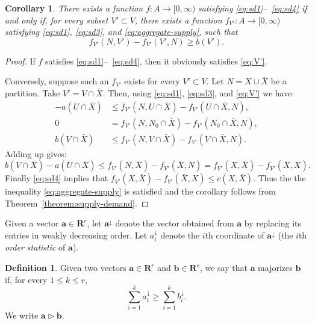 \documentclass{amsbook}
\newcommand{\bb}{\mathbf b}
\renewcommand{\aa}{\mathbf a}
\newcommand{\RR}{\mathbf R}
\newtheorem{corollary}[theorem]{Corollary}
\theoremstyle{definition}
\newtheorem{definition}[theorem]{Definition}
\theoremstyle{remark}
\begin{document}
\begin{corollary}
  \label{cor:aggregate-supply}
  There exists a function $f:A\to [0,\infty)$ satisfying \eqref{eq:sd1}--~\eqref{eq:sd4} if and only if, for every subset $V'\subset V$, there exists a function $f_{V'}:A\to [0,\infty)$ satisfying \eqref{eq:sd1}, \eqref{eq:sd3}, and \eqref{eq:aggregate-supply}, such that
  \begin{equation}
    \label{eq:V'}
    \tag{SD5}
    f_{V'}(N,V')-f_{V'}(V',N)\geq b(V').
  \end{equation}
\end{corollary}
\begin{proof}
  If $f$ satisfies \eqref{eq:sd1}--~\eqref{eq:sd4}, then it obviously satisfies \eqref{eq:V'}.

  Conversely, suppose such an $f_{V'}$ exists for every $V'\subset V$.
  Let $N=X\cup \bar X$ be a partition.
  Take $V'=V\cap \bar X$.
  Then, using \eqref{eq:sd1}, \eqref{eq:sd3}, and \eqref{eq:V'} we have:
  \begin{align*}
    -a(U\cap\bar X)&\leq f_{V'}(N,U\cap \bar X)-f_{V'}(U\cap\bar X, N),\\
    0 & = f_{V'}(N,N_0\cap \bar X)-f_{V'}(N_0\cap\bar X, N),\\
    b(V\cap \bar X) & \leq f_{V'}(N,V\cap \bar X)-f_{V'}(V\cap\bar X,N).
  \end{align*}
  Adding up gives:
  \begin{displaymath}
    b(V\cap\bar X)-a(U\cap\bar X) \leq f_{V'}(N,\bar X) - f_{V'}(\bar X, N) = f_{V'}(X,\bar X)-f_{V'}(\bar X,X).
  \end{displaymath}
  Finally \eqref{eq:sd4} implies that $f_{V'}(X,\bar X)-f_{V'}(\bar X,X)\leq c(X,\bar X)$.
  Thus the the inequality \eqref{eq:aggregate-supply} is satisfied and the corollary follows from Theorem~\ref{theorem:supply-demand}.
\end{proof}
Given a vector $\aa\in \RR^r$, let $\aa^\downarrow$ denote the vector obtained from $\aa$ by replacing its entries in weakly decreasing order.
Let $a^\downarrow_i$ denote the $i$th coordinate of $\aa^\downarrow$ (the $i$th \emph{order statistic} of $\aa$).
\begin{definition}
  \label{definition:majorization}
  Given two vectors $\aa\in \RR^r$ and $\bb\in \RR^s$, we say that $\aa$ majorizes $\bb$ if, for every $1\leq k\leq r$,
  \begin{displaymath}
    \sum_{i=1}^k a^\downarrow_i \geq \sum_{i=1}^k b^\downarrow_i. 
  \end{displaymath}
  We write $\aa\rhd \bb$.
\end{definition}
\end{document}
